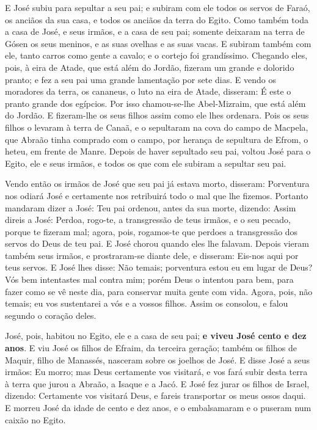 E José subiu para sepultar a seu pai; e subiram com ele todos os
servos de Faraó, os anciãos da sua casa, e todos os anciãos da terra
do Egito. Como também toda a casa de José, e seus irmãos, e a
casa de seu pai; somente deixaram na terra de Gósen os seus meninos,
e as suas ovelhas e as suas vacas. E subiram também com ele,
tanto carros como gente a cavalo; e o cortejo foi grandíssimo.
Chegando eles, pois, à eira de Atade, que está além do
Jordão, fizeram um grande e dolorido pranto; e fez a seu pai uma
grande lamentação por sete dias. E vendo os moradores da
terra, os cananeus, o luto na eira de Atade, disseram: É este o
pranto grande dos egípcios. Por isso chamou-se-lhe Abel-Mizraim, que
está além do Jordão. E fizeram-lhe os seus filhos assim como
ele lhes ordenara. Pois os seus filhos o levaram à terra de
Canaã, e o sepultaram na cova do campo de Macpela, que Abraão tinha
comprado com o campo, por herança de sepultura de Efrom, o heteu, em
frente de Manre. Depois de haver sepultado seu pai, voltou
José para o Egito, ele e seus irmãos, e todos os que com ele subiram
a sepultar seu pai.

Vendo então os irmãos de José que seu pai já estava morto,
disseram: Porventura nos odiará José e certamente nos retribuirá
todo o mal que lhe fizemos. Portanto mandaram dizer a José:
Teu pai ordenou, antes da sua morte, dizendo: Assim direis a
José: Perdoa, rogo-te, a transgressão de teus irmãos, e o seu
pecado, porque te fizeram mal; agora, pois, rogamos-te que perdoes a
transgressão dos servos do Deus de teu pai. E José chorou quando
eles lhe falavam. Depois vieram também seus irmãos, e
prostraram-se diante dele, e disseram: Eis-nos aqui por teus servos.
E José lhes disse: Não temais; porventura estou eu em lugar
de Deus? Vós bem intentastes mal contra mim; porém Deus o
intentou para bem, para fazer como se vê neste dia, para conservar
muita gente com vida. Agora, pois, não temais; eu vos
sustentarei a vós e a vossos filhos. Assim os consolou, e falou
segundo o coração deles.

José, pois, habitou no Egito, ele e a casa de seu pai; \textbf{e
viveu José cento e dez anos}. E viu José os filhos de Efraim,
da terceira geração; também os filhos de Maquir, filho de Manassés,
nasceram sobre os joelhos de José. E disse José a seus
irmãos: Eu morro; mas Deus certamente vos visitará, e vos fará subir
desta terra à terra que jurou a Abraão, a Isaque e a Jacó. E
José fez jurar os filhos de Israel, dizendo: Certamente vos visitará
Deus, e fareis transportar os meus ossos daqui. E morreu José
da idade de cento e dez anos, e o embalsamaram e o puseram num
caixão no Egito.

